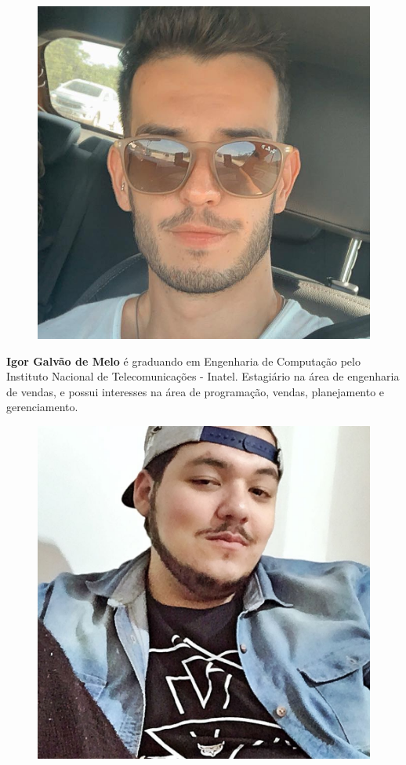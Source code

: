 \begin{figure}
\includegraphics[width=\linewidth]{figuras/autor_igor.jpg}
\end{figure}

\textbf{Igor Galvão de Melo} é graduando em Engenharia de Computação pelo Instituto Nacional de Telecomunicações - Inatel. Estagiário na área de engenharia de vendas, e possui interesses na área de programação, vendas, planejamento e gerenciamento.\newline

\begin{figure}
\includegraphics[width=\linewidth]{figuras/autor_lucas.jpg}
\end{figure}


